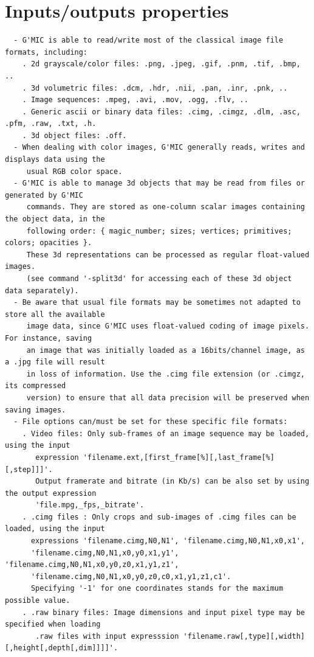 \documentclass[a4paper,11pt,twoside]{book}
\begin{document}
\section{Inputs/outputs properties}
\small
\begin{lstlisting}
  - G'MIC is able to read/write most of the classical image file formats, including: 
    . 2d grayscale/color files: .png, .jpeg, .gif, .pnm, .tif, .bmp, .. 
    . 3d volumetric files: .dcm, .hdr, .nii, .pan, .inr, .pnk, .. 
    . Image sequences: .mpeg, .avi, .mov, .ogg, .flv, .. 
    . Generic ascii or binary data files: .cimg, .cimgz, .dlm, .asc, .pfm, .raw, .txt, .h. 
    . 3d object files: .off. 
  - When dealing with color images, G'MIC generally reads, writes and displays data using the 
     usual RGB color space. 
  - G'MIC is able to manage 3d objects that may be read from files or generated by G'MIC 
     commands. They are stored as one-column scalar images containing the object data, in the 
     following order: { magic_number; sizes; vertices; primitives; colors; opacities }. 
     These 3d representations can be processed as regular float-valued images. 
     (see command '-split3d' for accessing each of these 3d object data separately). 
  - Be aware that usual file formats may be sometimes not adapted to store all the available 
     image data, since G'MIC uses float-valued coding of image pixels. For instance, saving 
     an image that was initially loaded as a 16bits/channel image, as a .jpg file will result 
     in loss of information. Use the .cimg file extension (or .cimgz, its compressed 
     version) to ensure that all data precision will be preserved when saving images. 
  - File options can/must be set for these specific file formats: 
    . Video files: Only sub-frames of an image sequence may be loaded, using the input 
       expression 'filename.ext,[first_frame[%][,last_frame[%][,step]]]'. 
       Output framerate and bitrate (in Kb/s) can be also set by using the output expression 
       'file.mpg,_fps,_bitrate'. 
    . .cimg files : Only crops and sub-images of .cimg files can be loaded, using the input 
      expressions 'filename.cimg,N0,N1', 'filename.cimg,N0,N1,x0,x1', 
      'filename.cimg,N0,N1,x0,y0,x1,y1', 'filename.cimg,N0,N1,x0,y0,z0,x1,y1,z1', 
      'filename.cimg,N0,N1,x0,y0,z0,c0,x1,y1,z1,c1'. 
      Specifying '-1' for one coordinates stands for the maximum possible value. 
    . .raw binary files: Image dimensions and input pixel type may be specified when loading 
       .raw files with input expresssion 'filename.raw[,type][,width][,height[,depth[,dim]]]]'. 

\end{lstlisting}
\end{document}
